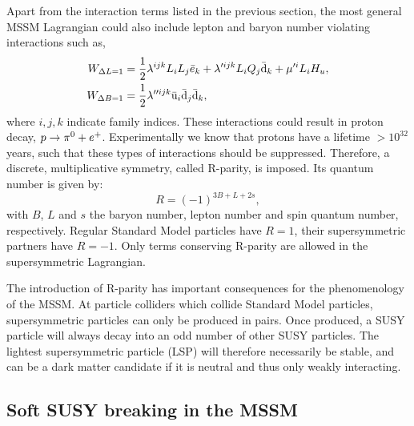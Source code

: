 Apart from the interaction terms listed in the previous section, the most general MSSM Lagrangian
could also include lepton and baryon number violating interactions such as, 
\begin{align}
  W_{\Delta L=1} &= \frac{1}{2} \lambda^{ijk} L_i L_j \bar{e}_k + \lambda'^{ijk} L_i Q_j
\bar{\mathrm{d}}_k + \mu'^{i} L_i H_u, \\
  W_{\Delta B=1} &= \frac{1}{2} \lambda''^{ijk} \bar{\mathrm{u}}_i \bar{\mathrm{d}}_j \bar{\mathrm{d}}_k, \\
\end{align}
where $i,j,k$ indicate family indices. 
These interactions could result in proton decay, ${p} \rightarrow \pi^0 + e^+$. Experimentally we
know that protons have a lifetime $>\text{10}^{\text{32}}$ years, such that these types of
interactions should be suppressed. 
Therefore, a discrete, multiplicative symmetry, called R-parity, is imposed. Its quantum number
is given by: 
\begin{equation}
  R = (-1)^{3B+L+2s} ,
\end{equation}
with $B$, $L$ and $s$ the baryon number, lepton number and spin quantum number, respectively. 
Regular Standard Model particles have $R=1$, their supersymmetric partners have $R=-1$. Only
terms conserving R-parity are allowed in the supersymmetric Lagrangian. 

The introduction of R-parity has important consequences for the phenomenology of the MSSM.
At particle colliders which collide Standard Model particles, supersymmetric particles can only be
produced in pairs. Once produced, a SUSY particle will always decay into an odd number of other SUSY
particles. The lightest supersymmetric particle (LSP) will therefore necessarily be stable, and can
be a dark matter candidate if it is neutral and thus only weakly interacting. 


\subsection{Soft SUSY breaking in the MSSM}

